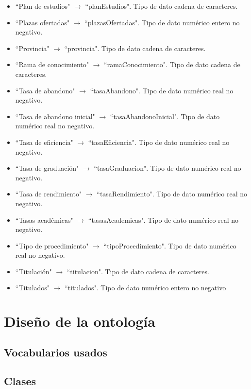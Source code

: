 \begin{itemize}
	\item ``Plan de estudios" $\rightarrow$ ``planEstudios". Tipo de dato cadena de caracteres.
	\item ``Plazas ofertadas" $\rightarrow$ ``plazasOfertadas". Tipo de dato numérico entero no negativo.
	\item ``Provincia" $\rightarrow$ ``provincia". Tipo de dato cadena de caracteres.
	\item ``Rama de conocimiento" $\rightarrow$ ``ramaConocimiento". Tipo de dato cadena de caracteres.
	\item ``Tasa de abandono" $\rightarrow$ ``tasaAbandono". Tipo de dato numérico real no negativo.
	\item ``Tasa de abandono inicial" $\rightarrow$ ``tasaAbandonoInicial". Tipo de dato numérico real no negativo.
	\item ``Tasa de eficiencia" $\rightarrow$ ``tasaEficiencia". Tipo de dato numérico real no negativo.
	\item ``Tasa de graduación" $\rightarrow$ ``tasaGraduacion". Tipo de dato numérico real no negativo.
	\item ``Tasa de rendimiento" $\rightarrow$ ``tasaRendimiento". Tipo de dato numérico real no negativo.
	\item ``Tasas académicas" $\rightarrow$ ``tasasAcademicas". Tipo de dato numérico real no negativo.
	\item ``Tipo de procedimiento" $\rightarrow$ ``tipoProcedimiento". Tipo de dato numérico real no negativo.
	\item ``Titulación" $\rightarrow$ ``titulacion". Tipo de dato cadena de caracteres.
	\item ``Titulados" $\rightarrow$ ``titulados". Tipo de dato numérico entero no negativo
\end{itemize}


\section{Diseño de la ontología}

\subsection{Vocabularios usados}

\subsection{Clases}

